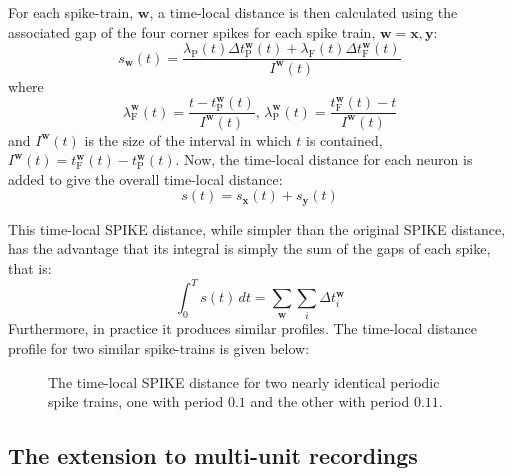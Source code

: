 \documentclass[11pt]{amsart}
\begin{document}
For each spike-train, $\mathbf{w}$, a time-local distance is then calculated using the associated gap of the four corner spikes for each spike train, $\mathbf{w}=\mathbf{x},\mathbf{y}$:
\begin{equation}
s_{\mathbf{w}}(t) = \frac{\lambda_{\mathrm{P}}(t)\Delta t_{\mathrm{P}}^{\mathbf{w}}(t)  + \lambda_{\mathrm{F}}(t)\Delta t_{\mathrm{F}}^{\mathbf{w}}(t) }{I^{\mathbf{w}}(t)}%
\end{equation}
where
\begin{equation}
\lambda_{\mathrm{F}}^{\mathbf{w}}(t) = \frac{t-t_{\mathrm{P}}^{\mathbf{w}}(t)}{I^{\mathbf{w}}(t)},%
\, \lambda_{\mathrm{P}}^{\mathbf{w}}(t) = \frac{t_{\mathrm{F}}^{\mathbf{w}}(t) - t}{I^{\mathbf{w}}(t)}%
\end{equation}
and $I^{\mathbf{w}}(t)$ is the size of the interval in which $t$ is contained, $I^{\mathbf{w}}(t) = t_{\mathrm{F}}^{\mathbf{w}}(t) - t_{\mathrm{P}}^{\mathbf{w}}(t)$.
Now, the time-local distance for each neuron is added to give the overall time-local distance:
\begin{equation}
s(t) = s_{\mathbf{x}}(t) + s_{\mathbf{y}}(t)
\end{equation}

This time-local SPIKE distance, while simpler than the original SPIKE distance, has the advantage that its integral is simply the sum of the gaps of each spike, that is:
\begin{equation}
\int_{0}^{T} s(t) \,dt = \sum_{\mathbf{w}} \sum_i \Delta t_i^{\mathbf{w}}
\end{equation}
Furthermore, in practice it produces similar profiles.  The time-local distance profile for two similar spike-trains is given below:

\begin{figure}[ht]
\begin{center}

\end{center}
\caption{The time-local SPIKE distance for two nearly identical periodic spike trains, one with period $0.1$ and the other with period $0.11$.}
\end{figure}


\subsection{The extension to multi-unit recordings}
\end{document}
